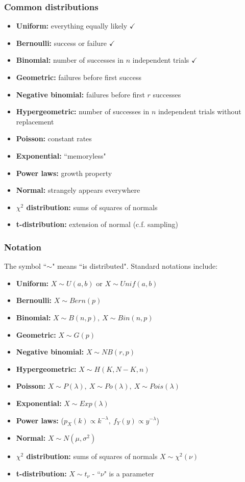 \documentclass[t,8pt]{beamer}%
\begin{document}
	\begin{frame}
		\frametitle{Common distributions}
		\begin{itemize}
            \item {\bf Uniform:} everything equally likely $\checkmark$
			\item {\bf Bernoulli:} success or failure $\checkmark$
			\item {\bf Binomial:} number of successes in $n$ independent trials $\checkmark$
			\item {\bf Geometric:} failures before first success
			\item {\bf Negative binomial:} failures before first $r$ successes
            \item {\bf Hypergeometric:} number of successes in $n$ independent trials without replacement
			\item {\bf Poisson:} constant rates
			\item {\bf Exponential:} ``memoryless"
			\item {\bf Power laws:} growth property
			\item {\bf Normal:} strangely appears everywhere
			\item {\bf $\chi^2$ distribution:} sums of squares of normals
			\item {\bf t-distribution:} extension of normal (c.f. sampling)
		\end{itemize}
	\end{frame}

    \begin{frame}
		\frametitle{Notation}
        The symbol ``$\sim$" means ``is distributed". Standard notations include:
		\begin{itemize}
            \item {\bf Uniform:} $X\sim U(a,b)$ or $X\sim Unif(a,b)$
			\item {\bf Bernoulli:} $X\sim Bern(p)$
			\item {\bf Binomial:} $X\sim B(n,p),\ X\sim Bin(n,p)$
			\item {\bf Geometric:} $X\sim G(p)$
			\item {\bf Negative binomial:} $X\sim NB(r,p)$
            \item {\bf Hypergeometric:} $X\sim H(K,N-K,n)$
			\item {\bf Poisson:} $X\sim P(\lambda),\ X\sim Po(\lambda),\ X\sim Pois(\lambda)$
			\item {\bf Exponential:} $X\sim Exp(\lambda)$
			\item {\bf Power laws:} ($p_X(k)\propto k^{-\lambda},\ f_Y(y)\propto y^{-\lambda}$)
			\item {\bf Normal:} $X\sim N(\mu,\sigma^2)$
			\item {\bf $\chi^2$ distribution:} sums of squares of normals $X\sim\chi^2(\nu)$
			\item {\bf t-distribution:} $X\sim t_{\nu}$ - ``$\nu$" is a parameter
		\end{itemize}
	\end{frame}
\end{document}
